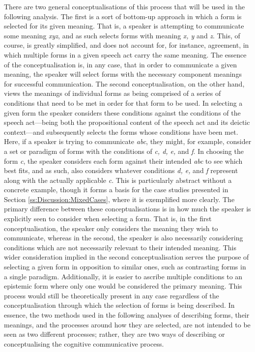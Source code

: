 There are two general conceptualisations of this process that will be used in the following analysis. The first is a sort of bottom-up approach in which a form is selected for its given meaning. That is, a speaker is attempting to communicate some meaning \textit{xyz}, and as such selects forms with meaning \textit{x, y} and \textit{z}. This, of course, is greatly simplified, and does not account for, for instance, agreement, in which multiple forms in a given speech act carry the same meaning. The essence of the conceptualisation is, in any case, that in order to communicate a given meaning, the speaker will select forms with the necessary component meanings for successful communication. The second conceptualisation, on the other hand, views the meanings of individual forms as being comprised of a series of conditions that need to be met in order for that form to be used. In selecting a given form the speaker considers these conditions against the conditions of the speech act---being both the propositional content of the speech act and its deictic context---and subsequently selects the forms whose conditions have been met. Here, if a speaker is trying to communicate \textit{abc}, they might, for example, consider a set or paradigm of forms with the conditions of \textit{c, d, e,} and \textit{f}. In choosing the form \textit{c}, the speaker considers each form against their intended \textit{abc} to see which best fits, and as such, also considers whatever conditions \textit{d, e,} and \textit{f} represent along with the actually applicable \textit{c}. This is particularly abstract without a concrete example, though it forms a basis for the case studies presented in Section \ref{ss:Discussion:MixedCases}, where it is exemplified more clearly. The primary difference between these conceptualisations is in how much the speaker is explicitly seen to consider when selecting a form. That is, in the first conceptualisation, the speaker only considers the meaning they wish to communicate, whereas in the second, the speaker is also necessarily considering conditions which are not necessarily relevant to their intended meaning. This wider consideration implied in the second conceptualisation serves the purpose of selecting a given form in opposition to similar ones, such as contrasting forms in a single paradigm. Additionally, it is easier to ascribe multiple conditions to an epistemic form where only one would be considered the primary meaning. This process would still be theoretically present in any case regardless of the conceptualisation through which the selection of forms is being described. In essence, the two methods used in the following analyses of describing forms, their meanings, and the processes around how they are selected, are not intended to be seen as two different processes; rather, they are two ways of describing or conceptualising the cognitive communicative process.